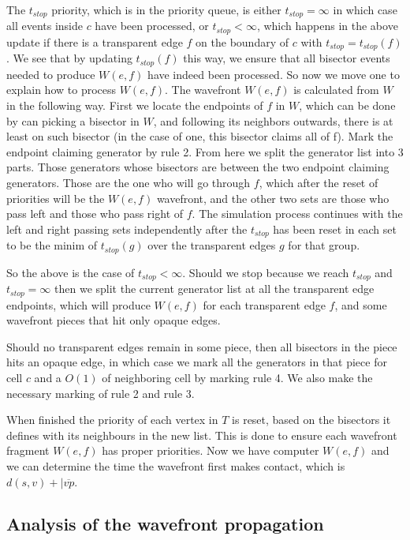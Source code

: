 The $t_{stop}$ priority, which is in the priority queue, is either $t_{stop} = \infty$ in which case all events inside $c$ have been 
processed, or $t_{stop} < \infty$, which happens in the above update if there is a transparent edge $f$ on the boundary of $c$ with 
$t_{stop} = t_{stop}(f)$. We see that by updating $t_{stop}(f)$ this way, we ensure that all bisector events needed to produce $W(e,f)$
have indeed been processed. So now we move one to explain how to process $W(e,f)$. The wavefront $W(e,f)$ is calculated from $W$ in the
following way. First we locate the endpoints of $f$ in $W$, which can be done by can picking a bisector in $W$, and following its 
neighbors outwards, there is at least on such bisector (in the case of one, this bisector claims all of f). Mark the endpoint claiming 
generator by rule 2. From here we split the generator list into 3 parts. Those generators whose bisectors are between the two endpoint 
claiming generators. Those are the one who will go through $f$, which after the reset of priorities will be the $W(e,f)$ wavefront, and
the other two sets are those who pass left and those who pass right of $f$. The simulation process continues with the left and right 
passing sets independently after the $t_{stop}$ has been reset in each set to be the minim of $t_{stop}(g)$ over the transparent edges 
$g$ for that group. 

\missingfigure[]{}

So the above is the case of $t_{stop} < \infty$. Should we stop because we reach $t_{stop}$ and $t_{stop} = \infty$ then we split the 
current generator list at all the transparent edge endpoints, which will produce $W(e,f)$ for each transparent edge $f$, and some 
wavefront pieces that hit only opaque edges.

Should no transparent edges remain in some piece, then all bisectors in the piece hits an opaque edge, in which case we mark all the 
generators in that piece for cell $c$ and a $O(1)$ of neighboring cell by marking rule 4. We also make the necessary marking of rule 2 
and rule 3.

When finished the priority of each vertex in $T$ is reset, based on the bisectors it defines with its neighbours in the new list. This 
is done to ensure each wavefront fragment $W(e,f)$ has proper priorities. Now we have computer $W(e,f)$ and we can determine the time 
the wavefront first makes contact, which is $d(s,v)+|\overline{vp}$.

\subsection{Analysis of the wavefront propagation}

